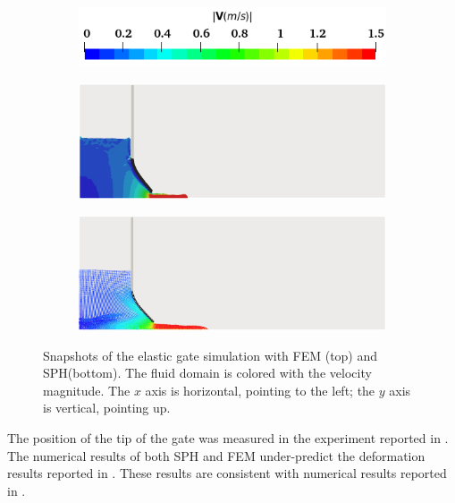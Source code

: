 \begin{figure}[H]
	\centering    
	\begin{subfigure}{0.4\columnwidth}    
		\centering
		\includegraphics[width=1.0\textwidth]{images/FSI_Comparison/FSI_colorbar.png}
	\end{subfigure}
	\begin{subfigure}{0.8\columnwidth}    
		\centering
		\includegraphics[width=1.0\textwidth]{images/FSI_Comparison/FSI_FEM.png}
	\end{subfigure}
	\begin{subfigure}{0.8\columnwidth}
		\centering
		\includegraphics[width=1.0\textwidth]{images/FSI_Comparison/FSI_SPH.png}
	\end{subfigure}
	\caption{Snapshots of the elastic gate simulation with FEM (top) and SPH(bottom). The fluid domain is colored with the velocity magnitude. The $x$ axis is horizontal, pointing to the left; the $y$ axis is vertical, pointing up.}
	\label{fig:EG}
\end{figure} 
The position of the tip of the gate was measured in the experiment reported in \cite{Antoci2007}. The numerical results of both SPH and FEM under-predict the deformation results reported in \cite{Antoci2007}. These results are consistent with numerical results reported in \cite{yang2012}.

